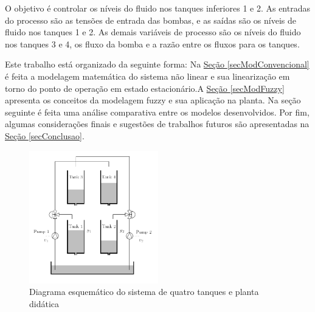 O objetivo é controlar os níveis do fluido nos tanques inferiores 1 e 2. As entradas do processo são as tensões de entrada das bombas, e as saídas são os níveis de fluido nos tanques 1 e 2. As demais variáveis de processo são os níveis do fluido nos tanques 3 e 4, os fluxo da bomba e a razão entre os fluxos para os tanques. 

Este trabalho está organizado da seguinte forma: Na \hyperref[secModConvencional]{Seção \ref{secModConvencional}} é feita a modelagem matemática do sistema não linear e sua linearização em torno do ponto de operação em estado estacionário.A  \hyperref[secModFuzzy]{Seção \ref{secModFuzzy}} apresenta os conceitos da modelagem fuzzy e sua aplicação na planta. Na seção seguinte é feita uma análise comparativa entre os modelos desenvolvidos. Por fim, algumas considerações finais e sugestões de trabalhos futuros são apresentadas na \hyperref[secConclusao]{Seção \ref{secConclusao}}.

\begin{figure}
	\begin{centering}
		\includegraphics[width=0.5\textwidth]{figs/4tank.png}
		\par\end{centering}
	\caption{\label{fig:teste_fig_01}Diagrama esquemático do sistema de quatro tanques e planta didática}
\end{figure}

%

